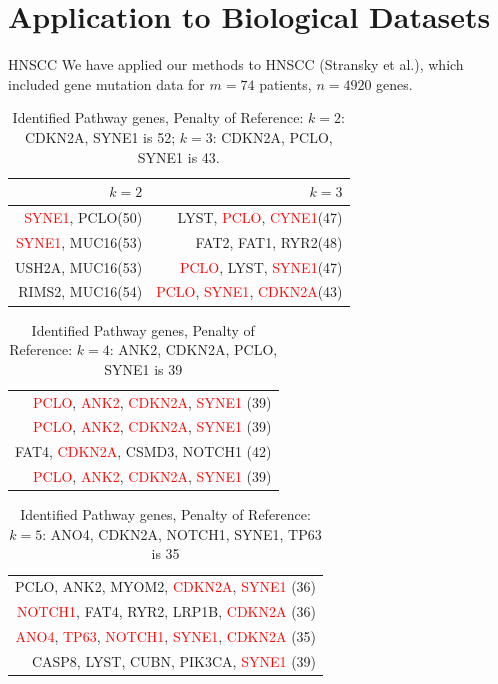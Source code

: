 \documentclass[xcolor=dvipsnames]{beamer}
\begin{document}
\section{Application to Biological Datasets}
\begin{frame}{HNSCC}
We have applied our methods to HNSCC (Stransky et al.), which included gene mutation data for $m=74$ patients, $n=4920$ genes.\\
\begin{table}
\centering
\begin{tabular}{r|r}
\hline
$k=2$&$k=3$\\
\hline
\textcolor{red}{SYNE1}, PCLO(50)&LYST, \textcolor{red}{PCLO}, \textcolor{red}{CYNE1}(47)\\
\textcolor{red}{SYNE1}, MUC16(53)&FAT2, FAT1, RYR2(48)\\
USH2A, MUC16(53)&\textcolor{red}{PCLO}, LYST, \textcolor{red}{SYNE1}(47)\\
RIMS2, MUC16(54)&\textcolor{red}{PCLO}, \textcolor{red}{SYNE1}, \textcolor{red}{CDKN2A}(43)\\
\hline
\end{tabular}
\caption{Identified Pathway genes, Penalty of Reference: $k=2$: CDKN2A, SYNE1 is 52; $k=3$: CDKN2A, PCLO, SYNE1 is 43.}
\end{table}
\end{frame}
\begin{frame}
\begin{table}
\begin{tabular}{r}
\hline
\textcolor{red}{PCLO}, \textcolor{red}{ANK2}, \textcolor{red}{CDKN2A}, \textcolor{red}{SYNE1} (39)\\
\textcolor{red}{PCLO}, \textcolor{red}{ANK2}, \textcolor{red}{CDKN2A}, \textcolor{red}{SYNE1} (39)\\
FAT4, \textcolor{red}{CDKN2A}, CSMD3, NOTCH1 (42)\\
\textcolor{red}{PCLO}, \textcolor{red}{ANK2}, \textcolor{red}{CDKN2A}, \textcolor{red}{SYNE1} (39)\\
\hline
\end{tabular}
\caption{Identified Pathway genes, Penalty of Reference: $k=4$: ANK2, CDKN2A, PCLO, SYNE1 is 39}
\end{table}
\end{frame}
\begin{frame}
\begin{table}
\begin{tabular}{r}
\hline
PCLO, ANK2, MYOM2, \textcolor{red}{CDKN2A}, \textcolor{red}{SYNE1} (36)\\
\textcolor{red}{NOTCH1}, FAT4, RYR2, LRP1B, \textcolor{red}{CDKN2A} (36)\\
\textcolor{red}{ANO4}, \textcolor{red}{TP63}, \textcolor{red}{NOTCH1}, \textcolor{red}{SYNE1}, \textcolor{red}{CDKN2A} (35)\\
CASP8, LYST, CUBN, PIK3CA, \textcolor{red}{SYNE1} (39)\\
\hline
\end{tabular}
\caption{Identified Pathway genes, Penalty of Reference: $k=5$: ANO4, CDKN2A, NOTCH1, SYNE1, TP63 is 35}
\end{table}
\end{frame}
\end{document}
